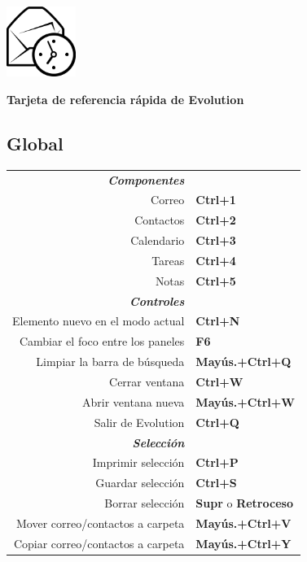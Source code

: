\documentclass[12pt]{article}
\date {}
\begin{document}
	\begin{landscape}


	\begin{center}
	\begin{minipage}[m]
		{1in}\includegraphics[height=0.9in]{../evolution-logo.eps}\hspace{5mm}
	\end{minipage}
	\hspace{5mm}
	\textbf{\Huge{Tarjeta de referencia rápida de Evolution}}
	\end{center}

	\begin{center}
	\begin{multicols}{2}
	\section*{Global}
	\begin{tabular*}{4in}{rp{1.5in}}
		\textit{\textbf{Componentes}}		&					\\
		Correo					& \textbf{Ctrl+1}			\\
		Contactos				& \textbf{Ctrl+2}			\\
		Calendario				& \textbf{Ctrl+3}			\\
		Tareas					& \textbf{Ctrl+4}			\\
		\vspace{1.5mm}
		Notas					& \textbf{Ctrl+5}			\\
		\textit{\textbf{Controles}}		&					\\
		Elemento nuevo en el modo actual	& \textbf{Ctrl+N}			\\
		Cambiar el foco entre los paneles	& \textbf{F6}				\\
		Limpiar la barra de búsqueda		& \textbf{Mayús.+Ctrl+Q}		\\
		Cerrar ventana				& \textbf{Ctrl+W}			\\
		Abrir ventana nueva			& \textbf{Mayús.+Ctrl+W}		\\
		\vspace{1.5mm}
		Salir de Evolution			& \textbf{Ctrl+Q}			\\
		\textit{\textbf{Selección}}		&					\\
		Imprimir selección			& \textbf{Ctrl+P}			\\
		Guardar selección			& \textbf{Ctrl+S}			\\
		Borrar selección			& \textbf{Supr} o \textbf{Retroceso}	\\
		Mover correo/contactos a carpeta	& \textbf{Mayús.+Ctrl+V}		\\
		Copiar correo/contactos a carpeta	& \textbf{Mayús.+Ctrl+Y}		\\
	\end{tabular*}

\end{multicols}
\end{center}
\end{landscape}
\end{document}
